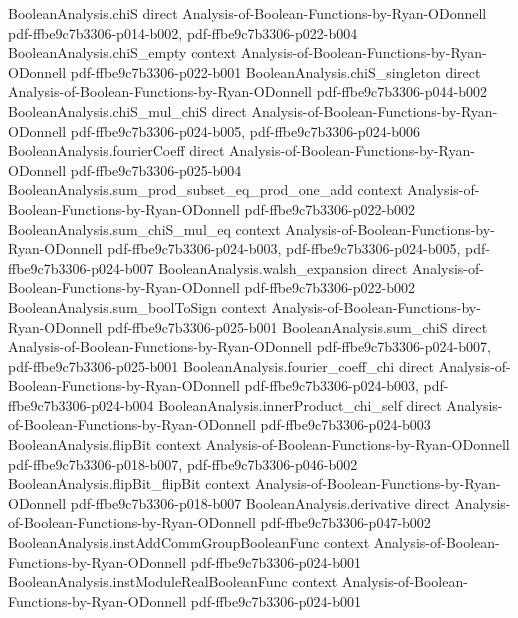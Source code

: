 \begin{theorem}
\proofstep
  {BooleanAnalysis.chiS}
  {direct}
  {Analysis-of-Boolean-Functions-by-Ryan-ODonnell}
  {pdf-ffbe9c7b3306-p014-b002,
    pdf-ffbe9c7b3306-p022-b004}
\proofstep
  {BooleanAnalysis.chiS_empty}
  {context}
  {Analysis-of-Boolean-Functions-by-Ryan-ODonnell}
  {pdf-ffbe9c7b3306-p022-b001}
\proofstep
  {BooleanAnalysis.chiS_singleton}
  {direct}
  {Analysis-of-Boolean-Functions-by-Ryan-ODonnell}
  {pdf-ffbe9c7b3306-p044-b002}
\proofstep
  {BooleanAnalysis.chiS_mul_chiS}
  {direct}
  {Analysis-of-Boolean-Functions-by-Ryan-ODonnell}
  {pdf-ffbe9c7b3306-p024-b005,
    pdf-ffbe9c7b3306-p024-b006}
\proofstep
  {BooleanAnalysis.fourierCoeff}
  {direct}
  {Analysis-of-Boolean-Functions-by-Ryan-ODonnell}
  {pdf-ffbe9c7b3306-p025-b004}
\proofstep
  {BooleanAnalysis.sum_prod_subset_eq_prod_one_add}
  {context}
  {Analysis-of-Boolean-Functions-by-Ryan-ODonnell}
  {pdf-ffbe9c7b3306-p022-b002}
\proofstep
  {BooleanAnalysis.sum_chiS_mul_eq}
  {context}
  {Analysis-of-Boolean-Functions-by-Ryan-ODonnell}
  {pdf-ffbe9c7b3306-p024-b003,
    pdf-ffbe9c7b3306-p024-b005,
    pdf-ffbe9c7b3306-p024-b007}
\proofstep
  {BooleanAnalysis.walsh_expansion}
  {direct}
  {Analysis-of-Boolean-Functions-by-Ryan-ODonnell}
  {pdf-ffbe9c7b3306-p022-b002}
\proofstep
  {BooleanAnalysis.sum_boolToSign}
  {context}
  {Analysis-of-Boolean-Functions-by-Ryan-ODonnell}
  {pdf-ffbe9c7b3306-p025-b001}
\proofstep
  {BooleanAnalysis.sum_chiS}
  {direct}
  {Analysis-of-Boolean-Functions-by-Ryan-ODonnell}
  {pdf-ffbe9c7b3306-p024-b007,
    pdf-ffbe9c7b3306-p025-b001}
\proofstep
  {BooleanAnalysis.fourier_coeff_chi}
  {direct}
  {Analysis-of-Boolean-Functions-by-Ryan-ODonnell}
  {pdf-ffbe9c7b3306-p024-b003,
    pdf-ffbe9c7b3306-p024-b004}
\proofstep
  {BooleanAnalysis.innerProduct_chi_self}
  {direct}
  {Analysis-of-Boolean-Functions-by-Ryan-ODonnell}
  {pdf-ffbe9c7b3306-p024-b003}
\proofstep
  {BooleanAnalysis.flipBit}
  {context}
  {Analysis-of-Boolean-Functions-by-Ryan-ODonnell}
  {pdf-ffbe9c7b3306-p018-b007,
    pdf-ffbe9c7b3306-p046-b002}
\proofstep
  {BooleanAnalysis.flipBit_flipBit}
  {context}
  {Analysis-of-Boolean-Functions-by-Ryan-ODonnell}
  {pdf-ffbe9c7b3306-p018-b007}
\proofstep
  {BooleanAnalysis.derivative}
  {direct}
  {Analysis-of-Boolean-Functions-by-Ryan-ODonnell}
  {pdf-ffbe9c7b3306-p047-b002}
\proofstep
  {BooleanAnalysis.instAddCommGroupBooleanFunc}
  {context}
  {Analysis-of-Boolean-Functions-by-Ryan-ODonnell}
  {pdf-ffbe9c7b3306-p024-b001}
\proofstep
  {BooleanAnalysis.instModuleRealBooleanFunc}
  {context}
  {Analysis-of-Boolean-Functions-by-Ryan-ODonnell}
  {pdf-ffbe9c7b3306-p024-b001}

\end{theorem}
